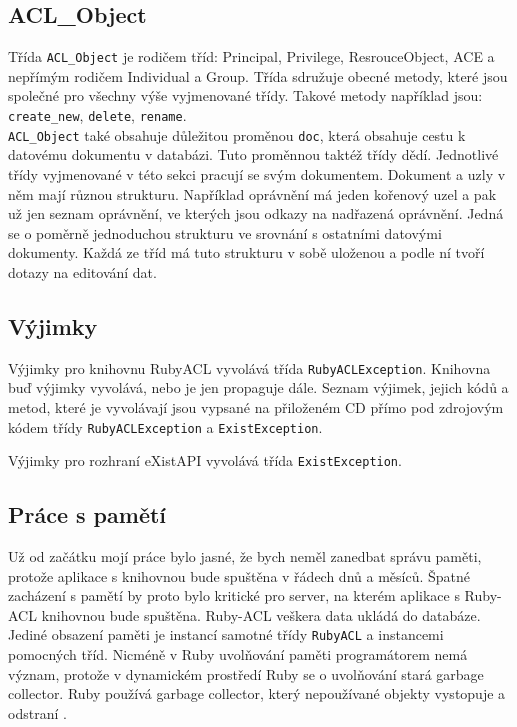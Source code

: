 
\subsection{ACL\_Object}
Třída \verb|ACL_Object| je rodičem tříd: Principal, Privilege, ResrouceObject, ACE a nepřímým rodičem Individual a Group.
Třída sdružuje obecné metody, které jsou společné pro všechny výše vyjmenované třídy. Takové metody například jsou: \verb|create_new|, \verb|delete|, \verb|rename|. \\ \verb|ACL_Object| také obsahuje důležitou proměnou \verb|doc|, která obsahuje cestu k datovému dokumentu v databázi. Tuto proměnnou taktéž třídy dědí.
Jednotlivé třídy vyjmenované v této sekci pracují se svým dokumentem. Dokument a uzly v něm mají různou strukturu. Například oprávnění má jeden kořenový uzel a pak už jen seznam oprávnění, ve kterých jsou odkazy na nadřazená oprávnění. Jedná se o poměrně jednoduchou strukturu ve srovnání s ostatními datovými dokumenty. Každá ze tříd má tuto strukturu v sobě uloženou a podle ní tvoří dotazy na editování dat.


\subsection{Výjimky}
Výjimky pro knihovnu RubyACL vyvolává třída \verb|RubyACLException|. Knihovna buď výjimky vyvolává, nebo je jen propaguje dále. Seznam výjimek, jejich kódů a metod, které je vyvolávají jsou vypsané na přiloženém CD přímo pod zdrojovým kódem třídy \verb|RubyACLException| a \verb|ExistException|.

\noindent Výjimky pro rozhraní eXistAPI vyvolává třída \verb|ExistException|.


\subsection{Práce s pamětí}
Už od začátku mojí práce bylo jasné, že bych neměl zanedbat správu paměti, protože aplikace s knihovnou bude spuštěna v řádech dnů a měsíců. Špatné zacházení s pamětí by proto bylo kritické pro server, na kterém aplikace s Ruby-ACL knihovnou bude spuštěna. Ruby-ACL veškera data ukládá do databáze. Jediné obsazení paměti je instancí samotné třídy \verb|RubyACL| a instancemi pomocných tříd. Nicméně v Ruby uvolňování paměti programátorem nemá význam, protože v dynamickém prostředí Ruby se o uvolňování stará garbage collector. Ruby používá garbage collector, který nepoužívané objekty vystopuje a odstraní \cite{Ruby}.